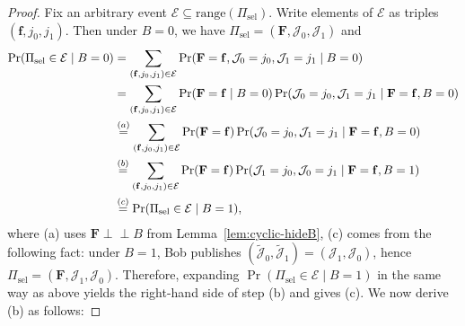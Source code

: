 \documentclass[onecolumn]{IEEEtran} %
\newcommand{\bF}{\mathbf F}
\newcommand{\1}{\mathbbm{1}}
\theoremstyle{boldremark}
\newcommand{\pperp}{\mathrel{\perp\!\!\!\perp}}
\begin{document}
\begin{proof}
Fix an arbitrary event $\mathcal E\subseteq \mathrm{range}(\Pi_{\mathrm{sel}})$.
Write elements of $\mathcal E$ as triples $(\mathbf f,j_0,j_1)$.
Then under $B=0$, we have $\Pi_{\mathrm{sel}}=(\bF,\mathcal J_0,\mathcal J_1)$ and
\begin{align}
\Pr(\Pi_{\mathrm{sel}}\in\mathcal E\mid B=0)
&=\sum_{(\mathbf f,j_0,j_1)\in\mathcal E}
   \Pr(\bF=\mathbf f,\mathcal J_0=j_0,\mathcal J_1=j_1\mid B=0)\notag\\
&=\sum_{(\mathbf f,j_0,j_1)\in\mathcal E}
   \Pr(\bF=\mathbf f\mid B=0)\Pr(\mathcal J_0=j_0,\mathcal J_1=j_1\mid \bF=\mathbf f,B=0)\notag\\
&\stackrel{(a)}{=}\sum_{(\mathbf f,j_0,j_1)\in\mathcal E}
   \Pr(\bF=\mathbf f)\Pr(\mathcal J_0=j_0,\mathcal J_1=j_1\mid \bF=\mathbf f,B=0)\notag\\
&\stackrel{(b)}{=}\sum_{(\mathbf f,j_0,j_1)\in\mathcal E}
   \Pr(\bF=\mathbf f)\Pr(\mathcal J_1=j_0, \mathcal J_0=j_1\mid \bF=\mathbf f,B=1)\notag\\
&\stackrel{(c)}=\Pr(\Pi_{\mathrm{sel}}\in\mathcal E\mid B=1),
\label{eq:Pi_sel_indep_B_optionA}
\end{align}
where (a) uses $\bF\pperp B$ from Lemma~\ref{lem:cyclic-hideB}, (c) comes from the following fact: under $B=1$, Bob publishes $(\tilde{\mathcal J}_0,\tilde{\mathcal J}_1)=(\mathcal J_1,\mathcal J_0)$,
hence $\Pi_{\mathrm{sel}}=(\bF,\mathcal J_1,\mathcal J_0)$.
Therefore, expanding $\Pr(\Pi_{\mathrm{sel}}\in\mathcal E\mid B=1)$ in the same way as above yields
the right-hand side of step (b) and gives (c). We now derive (b) as follows:


\end{proof}
\end{document}
